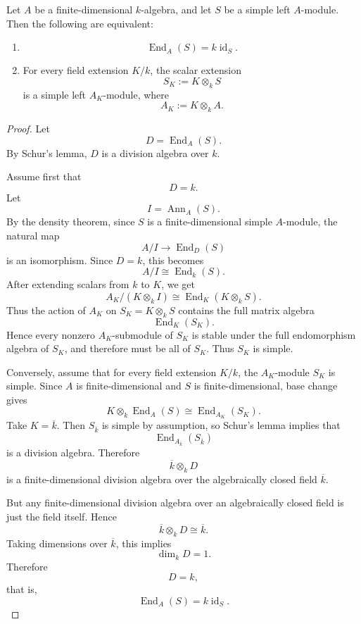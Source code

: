 \begin{proposition}
    Let \(A\) be a finite-dimensional \(k\)-algebra, and let \(S\) be a simple
    left \(A\)-module. Then the following are equivalent:

    \begin{enumerate}
        \item \[
                  \operatorname{End}_A(S)=k\operatorname{id}_S.
              \]

        \item For every field extension \(K/k\), the scalar extension
              \[
                  S_K:=K\otimes_k S
              \]
              is a simple left \(A_K\)-module, where
              \[
                  A_K:=K\otimes_k A.
              \]
    \end{enumerate}
\end{proposition}

\begin{proof}
    Let
    \[
        D=\operatorname{End}_A(S).
    \]
    By Schur's lemma, \(D\) is a division algebra over \(k\).

    Assume first that
    \[
        D=k.
    \]
    Let
    \[
        I=\operatorname{Ann}_A(S).
    \]
    By the density theorem, since \(S\) is a finite-dimensional simple
    \(A\)-module, the natural map
    \[
        A/I\longrightarrow \operatorname{End}_D(S)
    \]
    is an isomorphism. Since \(D=k\), this becomes
    \[
        A/I\cong \operatorname{End}_k(S).
    \]
    After extending scalars from \(k\) to \(K\), we get
    \[
        A_K/(K\otimes_k I)
        \cong
        \operatorname{End}_K(K\otimes_k S).
    \]
    Thus the action of \(A_K\) on \(S_K=K\otimes_k S\) contains the full matrix
    algebra
    \[
        \operatorname{End}_K(S_K).
    \]
    Hence every nonzero \(A_K\)-submodule of \(S_K\) is stable under the full
    endomorphism algebra of \(S_K\), and therefore must be all of \(S_K\). Thus
    \(S_K\) is simple.

    Conversely, assume that for every field extension \(K/k\), the \(A_K\)-module
    \(S_K\) is simple. Since \(A\) is finite-dimensional and \(S\) is finite-dimensional,
    base change gives
    \[
        K\otimes_k \operatorname{End}_A(S)
        \cong
        \operatorname{End}_{A_K}(S_K).
    \]
    Take \(K=\overline{k}\). Then \(S_{\overline{k}}\) is simple by assumption, so
    Schur's lemma implies that
    \[
        \operatorname{End}_{A_{\overline{k}}}(S_{\overline{k}})
    \]
    is a division algebra. Therefore
    \[
        \overline{k}\otimes_k D
    \]
    is a finite-dimensional division algebra over the algebraically closed field
    \(\overline{k}\).

    But any finite-dimensional division algebra over an algebraically closed field
    is just the field itself. Hence
    \[
        \overline{k}\otimes_k D\cong \overline{k}.
    \]
    Taking dimensions over \(\overline{k}\), this implies
    \[
        \dim_k D=1.
    \]
    Therefore
    \[
        D=k,
    \]
    that is,
    \[
        \operatorname{End}_A(S)=k\operatorname{id}_S.
    \]
\end{proof}

